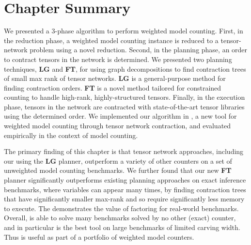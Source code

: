 \section{Chapter Summary} \label{sec:tensors:conclusion}
We presented a 3-phase algorithm to perform weighted model counting. First, in the reduction phase, a weighted model counting instance is reduced to a tensor-network problem using a novel reduction. Second, in the planning phase, an order to contract tensors in the network is determined. We presented two planning techniques, \textbf{LG} and \textbf{FT}, for using graph decompositions to find contraction trees of small max rank of tensor networks. \textbf{LG} is a general-purpose method for finding contraction orders. \textbf{FT} is a novel method tailored for constrained counting to handle high-rank, highly-structured tensors. Finally, in the execution phase, tensors in the network are contracted with state-of-the-art tensor libraries using the determined order.
We implemented our algorithm in , a new tool for weighted model counting through tensor network contraction, and evaluated  empirically in the context of model counting.

{ \color{blue}
The primary finding of this chapter is that tensor network approaches, including our  using the \textbf{LG} planner, outperform a variety of other counters on a set of unweighted model counting benchmarks.
We further found that our new \textbf{FT} planner significantly outperforms existing planning approaches on exact inference benchmarks, where variables can appear many times, by finding contraction trees that have significantly smaller max-rank and so require significantly less memory to execute.
The demonstrates the value of factoring for real-world benchmarks.
Overall,  is able to solve many benchmarks solved by no other (exact) counter, and in particular  is the best tool on large benchmarks of limited carving width.
Thus  is useful as part of a portfolio of weighted model counters.
} %

